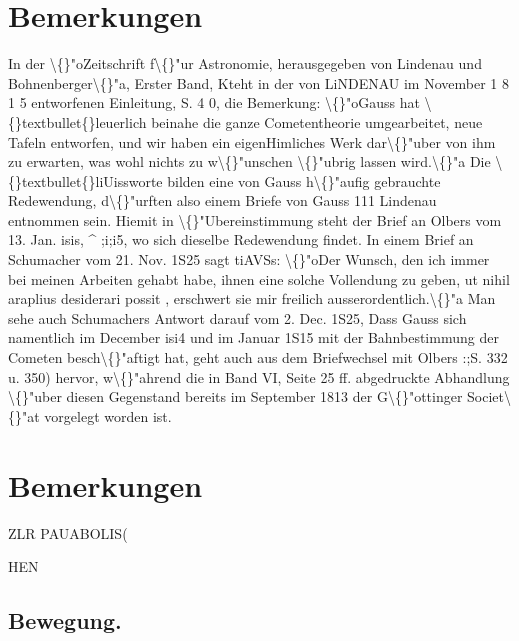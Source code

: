 \documentclass[10pt,a4paper]{article}
\begin{document}
\section*{Bemerkungen}
In der \textbackslash\{\}"oZeitschrift f\textbackslash\{\}"ur Astronomie, herausgegeben von Lindenau und Bohnenberger\textbackslash\{\}"a, Erster Band,
Kteht in der von LiNDENAU im November 1 8 1 5 entworfenen Einleitung, S. 4 0, die Bemerkung: \textbackslash\{\}"oGauss hat
\textbackslash\{\}textbullet\{\}leuerlich beinahe die ganze Cometentheorie umgearbeitet, neue Tafeln entworfen, und wir haben ein eigenHimliches Werk dar\textbackslash\{\}"uber von ihm zu erwarten, was wohl nichts zu w\textbackslash\{\}"unschen \textbackslash\{\}"ubrig lassen wird.\textbackslash\{\}"a Die
\textbackslash\{\}textbullet\{\}liUissworte bilden eine von Gauss h\textbackslash\{\}"aufig gebrauchte Redewendung, d\textbackslash\{\}"urften also einem Briefe von Gauss
111 Lindenau entnommen sein. Hiemit in \textbackslash\{\}"Ubereinstimmung steht der Brief an Olbers vom 13. Jan. isis,
\textasciicircum{} ;i;i5, wo sich dieselbe Redewendung findet. In einem Brief an Schumacher vom 21. Nov. 1S25 sagt
tiAVSs: \textbackslash\{\}"oDer Wunsch, den ich immer bei meinen Arbeiten gehabt habe, ihnen eine solche Vollendung zu
geben, ut nihil araplius desiderari possit , erschwert sie mir freilich ausserordentlich.\textbackslash\{\}"a Man sehe auch
Schumachers Antwort darauf vom 2. Dec. 1S25, Dass Gauss sich namentlich im December isi4 und im
Januar 1S15 mit der Bahnbestimmung der Cometen besch\textbackslash\{\}"aftigt hat, geht auch aus dem Briefwechsel mit
Olbers :;S. 332 u. 350) hervor, w\textbackslash\{\}"ahrend die in Band VI, Seite 25 ff. abgedruckte Abhandlung \textbackslash\{\}"uber diesen
Gegenstand bereits im September 1813 der G\textbackslash\{\}"ottinger Societ\textbackslash\{\}"at vorgelegt worden ist.

\newpage

\section*{Bemerkungen}

ZLR PAUABOLIS(

HEN

\subsection*{Bewegung.}
\end{document}
